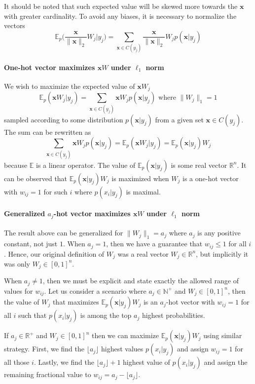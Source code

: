 \documentclass[12pt]{article}
\begin{document}
It should be noted that such expected value will be skewed more towards the $\boldsymbol{x}$ with greater cardinality. To avoid any biases, it is necessary to normalize the vectors 
\[
\mathbb{E}_{p}\big(\frac{\boldsymbol{x}}{\lVert \boldsymbol{x} \rVert_2}W_j|y_j \big)= \sum_{\boldsymbol{x}\in C(y_j)} \frac{\boldsymbol{x}}{\lVert \boldsymbol{x} \rVert_2} W_j p(\boldsymbol{x}|y_j)
\]


\paragraph{One-hot vector maximizes $\boldsymbol{x}W$ under $\ell_1$ norm}
We wish to maximize the expected value of $\boldsymbol{x}W_j$ 
\[
\mathbb{E}_{p}(\boldsymbol{x}W_j|y_j)=\sum_{\boldsymbol{x}\in C(y_j)} \boldsymbol{x} W_j p(\boldsymbol{x}|y_j) \text{ where } \lVert W_j \rVert_1=1
\]
sampled according to some distribution $p(\boldsymbol{x}|y_j)$ from a given set $\boldsymbol{x}\in C(y_j)$.  The sum can be rewritten as
\[
\sum_{\boldsymbol{x}\in C(y_j)} \boldsymbol{x} W_j p(\boldsymbol{x}|y_j) = \mathbb{E}_{p}(\boldsymbol{x} W_j|y_j) = \mathbb{E}_{p}(\boldsymbol{x}|y_j)W_j
\]
because $\mathbb{E}$ is a linear operator. The value of $\mathbb{E}_{p}(\boldsymbol{x}|y_j)$ is some real vector $\mathbb{R}^n$.  It can be observed that $\mathbb{E}_{p}(\boldsymbol{x}|y_j)W_j$ is maximized when $W_j$ is a one-hot vector with $w_{ij}=1$ for such $i$ where $p(x_i|y_j)$ is maximal. 

\paragraph{Generalized $a_j$-hot vector maximizes $\boldsymbol{x}W$ under $\ell_1$ norm}
The result above can be generalized for $\lVert W_j \rVert_1 = a_j$ where $a_j$ is any positive constant, not just $1$. When $a_j=1$, then we have a guarantee that $w_{ij}\le 1$ for all $i$. Hence, our original definition of $W_j$ was a real vector $W_j\in \mathbb{R}^n$, but implicitly it was only $W_j\in [0,1]^n$. 

When $a_j\ne 1$, then we must be explicit and state exactly the allowed range of values for $w_{ij}$. Let us consider a scenario where $a_j\in\mathbb{N}^+$ and $W_j\in [0,1]^n$, then the value of $W_j$ that maximizes $\mathbb{E}_{p}(\boldsymbol{x}|y_j)W_j$ is an $a_j$-hot vector with $w_{ij}=1$ for all $i$ such that $p(x_i|y_j)$ is among the top $a_j$ highest probabilities. 

If $a_j\in\mathbb{R}^+$ and $W_j\in [0,1]^n$ then we can maximize $\mathbb{E}_{p}(\boldsymbol{x}|y_j)W_j$ using similar strategy. First, we find the $\lfloor a_j \rfloor$ highest values $p(x_i|y_j)$ and assign $w_{ij}=1$ for all those $i$. Lastly, we find the $\lfloor a_j \rfloor+1$ highest value of $p(x_i|y_j)$ and assign the remaining fractional value to $w_{ij}=a_j - \lfloor a_j \rfloor$. 
\end{document}
